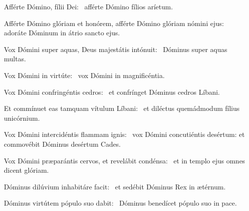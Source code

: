 \item Afférte Dómino, fílii Dei:~\psstar{} afférte Dómino fílios aríetum.

\item Afférte Dómino glóriam et honórem, afférte Dómino glóriam nómini ejus:~\psstar{} adoráte Dóminum in átrio sancto ejus.

\item Vox Dómini super aquas, Deus majestátis intónuit:~\psstar{} Dóminus super aquas multas.

\item Vox Dómini in virtúte:~\psstar{} vox Dómini in magnificéntia.

\item Vox Dómini confringéntis cedros:~\psstar{} et confrínget Dóminus cedros Líbani.

\item Et commínuet eas tamquam vítulum Líbani:~\psstar{} et diléctus quemádmodum fílius unicórnium.

\item Vox Dómini intercidéntis flammam ignis:~\psstar{} vox Dómini concutiéntis desértum: et commovébit Dóminus desértum Cades.

\item Vox Dómini præparántis cervos, et revelábit condénsa:~\psstar{} et in templo ejus omnes dicent glóriam.

\item Dóminus dilúvium inhabitáre facit:~\psstar{} et sedébit Dóminus Rex in ætérnum.

\item Dóminus virtútem pópulo suo dabit:~\psstar{} Dóminus benedícet pópulo suo in pace.

